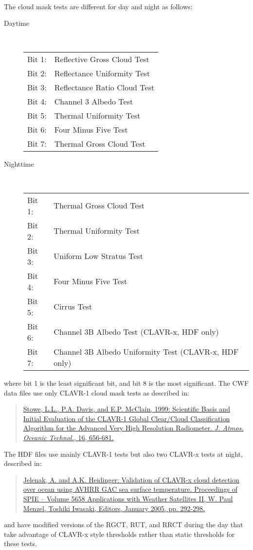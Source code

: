The cloud mask tests are different for day and night as follows:
\begin{description}

\item[Daytime]~\\
\begin{tabular}{ll}
Bit 1: & Reflective Gross Cloud Test\\
Bit 2: & Reflectance Uniformity Test\\
Bit 3: & Reflectance Ratio Cloud Test\\
Bit 4: & Channel 3 Albedo Test\\
Bit 5: & Thermal Uniformity Test\\
Bit 6: & Four Minus Five Test\\
Bit 7: & Thermal Gross Cloud Test
\end{tabular}

\item[Nighttime]~\\
\begin{tabular}{ll}
Bit 1: & Thermal Gross Cloud Test \\
Bit 2: & Thermal Uniformity Test\\
Bit 3: & Uniform Low Stratus Test\\
Bit 4: & Four Minus Five Test\\
Bit 5: & Cirrus Test\\
Bit 6: & Channel 3B Albedo Test (CLAVR-x, HDF only)\\
Bit 7: & Channel 3B Albedo Uniformity Test (CLAVR-x, HDF only)
\end{tabular}

\end{description}
where bit 1 is the least significant bit, and bit 8 is the most
significant.  The CWF data files use only CLAVR-1 cloud mask tests as
described in:
\begin{quote}
\href{http://ams.allenpress.com/perlserv/?request=get-abstract&doi=10.1175%2F1520-0426(1999)016%3C0656:SBAIEO%3E2.0.CO%3B2}{Stowe,
L.L., P.A. Davis, and E.P. McClain, 1999: Scientific Basis and Initial
Evaluation of the CLAVR-1 Global Clear/Cloud Classification Algorithm
for the Advanced Very High Resolution Radiometer. {\it
J. Atmos. Oceanic Technol.}, 16, 656-681.}
\end{quote}
The HDF files use mainly CLAVR-1 tests but also two CLAVR-x tests at
night, described in:
\begin{quote}
\href{http://spiedl.aip.org/getabs/servlet/GetabsServlet?prog=normal&id=PSISDG005658000001000292000001&idtype=cvips&gifs=yes}{Jelenak,
A. and A.K. Heidinger: Validation of CLAVR-x cloud detection over
ocean using AVHRR GAC sea surface temperature.  Proceedings of SPIE --
Volume 5658 Applications with Weather Satellites II, W. Paul Menzel,
Toshiki Iwasaki, Editors, January 2005, pp. 292-298.}
\end{quote}
and have modified versions of the RGCT, RUT, and RRCT during the day
that take advantage of CLAVR-x style thresholds rather than static
thresholds for these tests.

